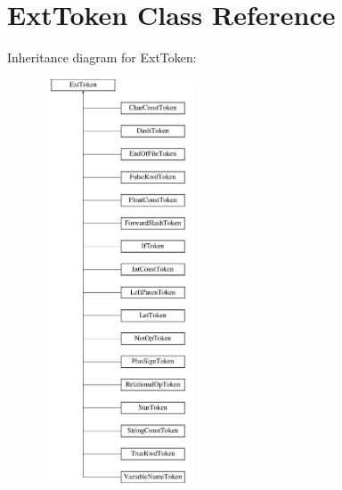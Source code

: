 \hypertarget{classExtToken}{\section{Ext\-Token Class Reference}
\label{classExtToken}
}
Inheritance diagram for Ext\-Token\-:\begin{figure}[H]
\begin{center}
\leavevmode
\includegraphics[height=12.000000cm]{classExtToken}
\end{center}
\end{figure}
